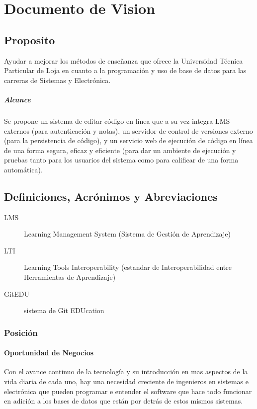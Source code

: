 

\chapter{Documento de Vision}


\section{Proposito}
Ayudar a mejorar los métodos de enseñanza que ofrece la Universidad Técnica Particular de Loja en cuanto a la programación y uso de base de datos para las carreras de Sistemas y Electrónica.
\paragraph{Alcance}
Se propone un sistema de editar código en línea que a su vez integra LMS externos (para autenticación y notas), un servidor de control de versiones externo (para la persistencia de código), y un servicio web de ejecución de código en línea de una forma segura, eficaz y eficiente (para dar un ambiente de ejecución y pruebas tanto para los usuarios del sistema como para calificar de una forma automática).
\section{Definiciones, Acrónimos y Abreviaciones}
\begin{description}
	\item[LMS] Learning Management System (Sistema de Gestión de Aprendizaje)
    \item[LTI] Learning Tools Interoperability (estandar de Interoperabilidad entre Herramientas de Aprendizaje)
    \item[GitEDU] sistema de Git EDUcation
\end{description}
\subsection{Posición}
\subsubsection{Oportunidad de Negocios}
Con el avance continuo de la tecnología y su introducción en mas aspectos de la vida diaria de cada uno, hay una necesidad creciente de ingenieros en sistemas e electrónica que pueden programar e entender el software que hace todo funcionar en adición a los bases de datos que están por detrás de estos mismos sistemas.
 
